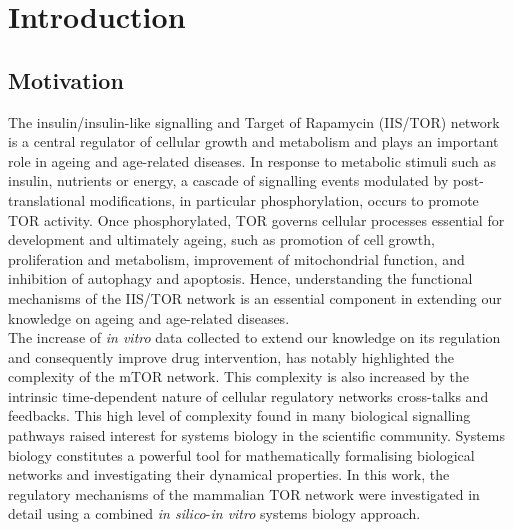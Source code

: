 \graphicspath{{Chapter1/Chapter1Figs/}}

\chapter{Introduction}
\label{chap:Introduction}

\section{Motivation}
\label{sec:Motivation}
The insulin/insulin-like signalling and Target of Rapamycin (IIS/TOR) network is a central regulator of cellular growth and metabolism and plays an important role in ageing and age-related diseases. In response to metabolic stimuli such as insulin, nutrients or energy, a cascade of signalling events modulated by post-translational modifications, in particular phosphorylation, occurs to promote TOR activity. Once phosphorylated, TOR governs cellular processes essential for development and ultimately ageing, such as promotion of cell growth, proliferation and metabolism, improvement of mitochondrial function, and inhibition of autophagy and apoptosis. Hence, understanding the functional mechanisms of the IIS/TOR network is an essential component in extending our knowledge on ageing and age-related diseases.\\
The increase of \emph{in vitro} data collected to extend our knowledge on its regulation and consequently improve drug intervention, has notably highlighted the complexity of the mTOR network. This complexity is also increased by the intrinsic time-dependent nature of cellular regulatory networks cross-talks and feedbacks. This high level of complexity found in many biological signalling pathways raised interest for systems biology in the scientific community. Systems biology constitutes a powerful tool for mathematically formalising biological networks and investigating their dynamical properties. In this work, the regulatory mechanisms of the mammalian TOR network were investigated in detail using a combined \emph{in silico}-\emph{in vitro} systems biology approach.

